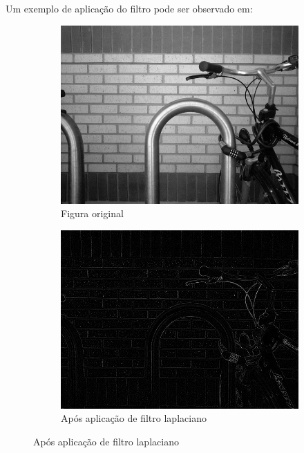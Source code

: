 \documentclass[10pt,a4paper]{article}
\begin{document}
Um exemplo de aplicação do filtro pode ser observado em:
\begin{figure}[!ht]
    \centering
    \begin{subfigure}[ht]{0.45\textwidth}
        \includegraphics[width=\textwidth]{src.jpg}
        \caption{Figura original\cite{bike}}
    \end{subfigure}
    \qquad
    \begin{subfigure}[ht]{0.45\textwidth}
        \includegraphics[width=\textwidth]{laplacian.jpg}
        \caption{\centering Após aplicação de filtro laplaciano}
    \end{subfigure}
    \label{fig:lapl}
\end{figure}
\end{document}
